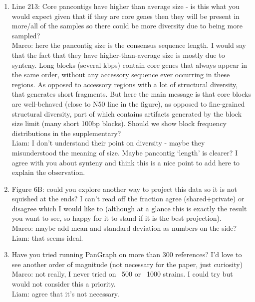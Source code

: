 \documentclass[aps,rmp,onecolumn]{revtex4-1}
\newcommand{\Marco}[1]{{\color{gray}Marco: #1}}
\newcommand{\Liam}[1]{{\color{teal}Liam: #1}}
\begin{document}
\begin{enumerate}
      \item Line 213: Core pancontigs have higher than average size - is this what you would expect given that if they are core genes then they will be present in more/all of the samples so there could be more diversity due to being more sampled?\\
            \Marco{here the pancontig size is the consensus sequence length. I would say that the fact that they have higher-than-average size is mostly due to synteny. Long blocks (several kbps) contain core genes that always appear in the same order, without any accessory sequence ever occurring in these regions. As opposed to accessory regions with a lot of structural diversity, that generates short fragments. But here the main message is that core blocks are well-behaved (close to N50 line in the figure), as opposed to fine-grained structural diversity, part of which contains artifacts generated by the block size limit (many short 100bp blocks). Should we show block frequency distributions in the supplementary?}\\
            \Liam{I don't understand their point on diversity - maybe they misunderstood the meaning of size. Maybe pancontig `length' is clearer? I agree with you about synteny and think this is a nice point to add here to explain the observation.}

      \item Figure 6B: could you explore another way to project this data so it is not squished at the ends? I can't read off the fraction agree (shared+private) or disagree which I would like to (although at a glance this is exactly the result you want to see, so happy for it to stand if it is the best projection).\\
            \Marco{maybe add mean and standard deviation as numbers on the side?}\\
            \Liam{that seems ideal.}

      \item Have you tried running PanGraph on more than 300 references? I'd love to see another order of magnitude (not necessary for the paper, just curiosity)\\
            \Marco{not really, I never tried on ~500 or ~1000 strains. I could try but would not consider this a priority.}\\
            \Liam{agree that it's not necessary.}


\end{enumerate}
\end{document}
